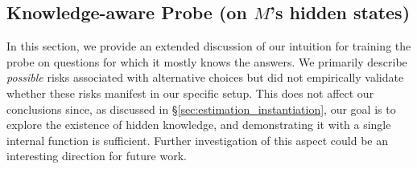 \subsection{Knowledge-aware Probe (on \texorpdfstring{$M$}{M}'s hidden states)}
\label{sec:knowledge_aware_probe_more_details}

In this section, we provide an extended discussion of our intuition for training the probe on questions for which it mostly knows the answers. We primarily describe \textit{possible} risks associated with alternative choices but did not empirically validate whether these risks manifest in our specific setup. This does not affect our conclusions since, as discussed in \S \ref{sec:estimation_instantiation}, our goal is to explore the existence of hidden knowledge, and demonstrating it with a single internal function is sufficient. Further investigation of this aspect could be an interesting direction for future work.

